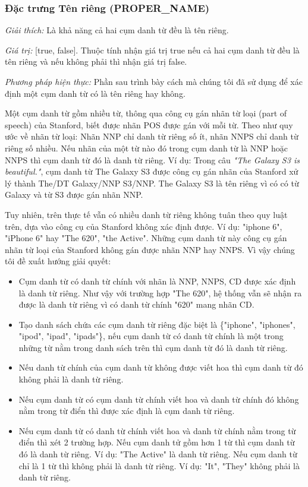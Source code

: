 \documentclass[12pt]{report}
\begin{document}
				\subsubsection*{Đặc trưng Tên riêng (PROPER\_NAME)}
					\par \textit{Giải thích:} Là khả năng cả hai cụm danh từ đều là tên riêng.
					\par \textit{Giá trị:} [true, false]. Thuộc tính nhận giá trị true nếu cả hai cụm danh từ đều là tên riêng và nếu không phải thì nhận giá trị false.
					\par \textit{Phương pháp hiện thực:} Phần sau trình bày cách mà chúng tôi đã sử dụng để xác định một cụm danh từ có là tên riêng hay không.				
					\par Một cụm danh từ gồm nhiều từ, thông qua công cụ gán nhãn từ loại (part of speech) của Stanford, biết được nhãn POS được gán với mỗi từ. Theo như quy ước về nhãn từ loại: Nhãn NNP chỉ danh từ riêng số ít, nhãn NNPS chỉ danh từ riêng số nhiều. Nếu nhãn của một từ nào đó trong cụm danh từ là NNP hoặc NNPS thì cụm danh từ đó là danh từ riêng. Ví dụ: Trong câu \textit{"The Galaxy S3 is beautiful."}, cụm danh từ The Galaxy S3 được công cụ gán nhãn của Stanford xử lý thành The/DT Galaxy/NNP S3/NNP. The Galaxy S3 là tên riêng vì có có từ Galaxy và từ S3 được gán nhãn NNP.
					\par Tuy nhiên, trên thực tế vẫn có nhiều danh từ riêng không tuân theo quy luật trên, dựa vào công cụ của Stanford không xác định được. Ví dụ: "iphone 6", "iPhone 6" hay "The 620", "the Active". Những cụm danh từ này công cụ gán nhãn từ loại của Stanford không gán được nhãn NNP hay NNPS. Vì vậy chúng tôi đề xuất hướng giải quyết:
					\begin{itemize}
						\item{Cụm danh từ có danh từ chính với nhãn là NNP, NNPS, CD được xác định là danh từ riêng. Như vậy với trường hợp "The 620", hệ thống vẫn sẽ nhận ra được là danh từ riêng vì có danh từ chính "620" mang nhãn CD.}
						\item{Tạo danh sách chứa các cụm danh từ riêng đặc biệt là \{"iphone", "iphones", "ipod", "ipad", "ipads"\}, nếu cụm danh từ có danh từ chính là một trong những từ nằm trong danh sách trên thì cụm danh từ đó là danh từ riêng.}
						\item{Nếu danh từ chính của cụm danh từ không được viết hoa thì cụm danh từ đó không phải là danh từ riêng.}
						\item{Nếu cụm danh từ có cụm danh từ chính viết hoa và danh từ chính đó không nằm trong từ điển thì được xác định là cụm danh từ riêng.}
						\item{Nếu cụm danh từ có danh từ chính viết hoa và danh từ chính nằm trong từ điển thì xét 2 trường hợp. Nếu cụm danh tử gồm hơn 1 từ thì cụm danh từ đó là danh từ riêng. Ví dụ: "The Active" là danh từ riêng. Nếu cụm danh từ chỉ là 1 từ thì không phải là danh từ riêng. Ví dụ: "It", "They" không phải là danh từ riêng.}
					\end{itemize}
\end{document}
